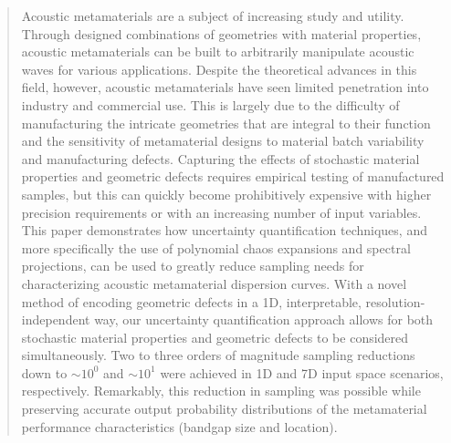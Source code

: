 \documentclass[preprint,review,12pt]{elsarticle}
\begin{document}
\begin{frontmatter}
\author[Mech]{Han Zhang}
\author[Mech]{Rayehe Karimi Mahabadi}
\author[Comp]{Cynthia Rudin}
\author[Civil]{Johann Guilleminot}
\author[Mech]{L. Catherine Brinson}
\begin{abstract}
Acoustic metamaterials are a subject of increasing study and utility. Through designed combinations of geometries with material properties, acoustic metamaterials can be built to arbitrarily manipulate acoustic waves for various applications. Despite the theoretical advances in this field, however, acoustic metamaterials have seen limited penetration into industry and commercial use. This is largely due to the difficulty of manufacturing the intricate geometries that are integral to their function and the sensitivity of metamaterial designs to material batch variability and manufacturing defects. Capturing the effects of stochastic material properties and geometric defects requires empirical testing of manufactured samples, but this can quickly become prohibitively expensive with higher precision requirements or with an increasing number of input variables. This paper demonstrates how uncertainty quantification techniques, and more specifically the use of polynomial chaos expansions and spectral projections, can be used to greatly reduce sampling needs for characterizing acoustic metamaterial dispersion curves. With a novel method of encoding geometric defects in a 1D, interpretable, resolution-independent way, our uncertainty quantification approach allows for both stochastic material properties and geometric defects to be considered simultaneously. Two to three orders of magnitude sampling reductions down to $\sim10^0$ and $\sim10^1$ were achieved in 1D and 7D input space scenarios, respectively. Remarkably, this reduction in sampling was possible while preserving accurate output probability distributions of the metamaterial performance characteristics (bandgap size and location).
\end{abstract}


\end{frontmatter}
\end{document}

